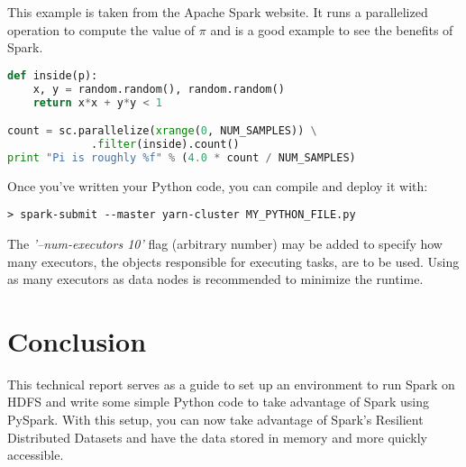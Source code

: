 \documentclass[9pt,twocolumn,twoside]{idsi}
\begin{document}
This example is taken from the Apache Spark website. It runs a parallelized operation to compute the value of $\pi$ and is a good example to see the benefits of Spark.

\begin{lstlisting}[language=Python]
def inside(p):
    x, y = random.random(), random.random()
    return x*x + y*y < 1

count = sc.parallelize(xrange(0, NUM_SAMPLES)) \
             .filter(inside).count()
print "Pi is roughly %f" % (4.0 * count / NUM_SAMPLES)
\end{lstlisting}

Once you've written your Python code, you can compile and deploy it with:
\begin{verbatim}
> spark-submit --master yarn-cluster MY_PYTHON_FILE.py
\end{verbatim}

\noindent
The \textit{'--num-executors 10'} flag (arbitrary number) may be added to specify how many executors, the objects responsible for executing tasks, are to be used. Using as many executors as data nodes is recommended to minimize the runtime.

\section{Conclusion}

This technical report serves as a guide to set up an environment to run Spark on HDFS and write some simple Python code to take advantage of Spark using PySpark. With this setup, you can now take advantage of Spark's Resilient Distributed Datasets and have the data stored in memory and more quickly accessible.
\end{document}
